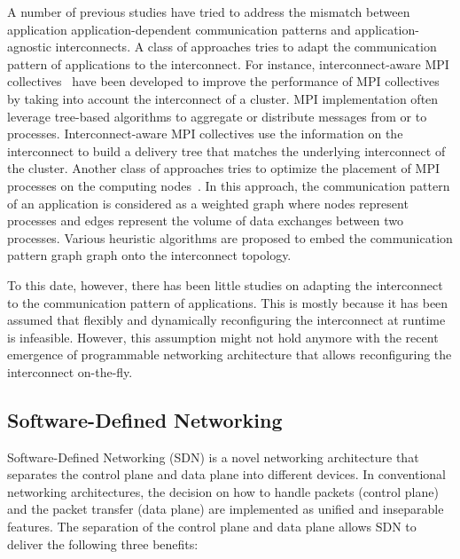 A  number of previous studies have tried to address the mismatch between
application application-dependent communication patterns and
application-agnostic interconnects. A class of approaches tries to adapt
the communication pattern of applications to the interconnect.
For instance, interconnect-aware MPI
collectives~\autocite{Kumar2016,Kumar2014,Gong2015,Adachi2013} have been
developed to improve the performance of MPI collectives by taking into account
the interconnect of a cluster. MPI implementation often leverage tree-based
algorithms to aggregate or distribute messages from or to processes.
Interconnect-aware MPI collectives use the information on the interconnect to
build a delivery tree that matches the underlying interconnect of the cluster.
Another class of approaches tries to optimize the placement of MPI processes
on the computing nodes~\autocite{Michelogiannakis2017,Hoefler2011,Choi2017}.
In this approach, the communication pattern of an application is considered as
a weighted graph where nodes represent processes and edges represent the
volume of data exchanges between two processes. Various heuristic algorithms
are proposed to embed the communication pattern graph graph onto the
interconnect topology.

To this date, however, there has been little studies on adapting the
interconnect to the communication pattern of applications. This is mostly
because it has been assumed that flexibly and dynamically reconfiguring the
interconnect at runtime is infeasible. However, this assumption might not hold
anymore with the recent emergence of programmable networking architecture that
allows reconfiguring the interconnect on-the-fly.

\subsection{Software-Defined Networking}

Software-Defined Networking (SDN) is a novel networking architecture
that separates the control plane and data plane into different devices.
In conventional networking architectures, the decision on how to handle
packets (control plane) and the packet transfer (data plane) are
implemented as unified and inseparable features. The separation of the
control plane and data plane allows SDN to deliver the following three
benefits:

